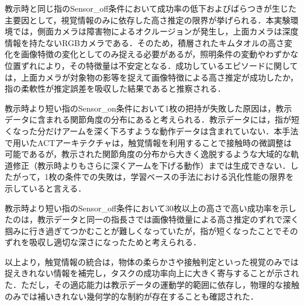 教示時と同じ指のSensor\_off条件において成功率の低下およびばらつきが生じた主要因として，視覚情報のみに依存した高さ推定の限界が挙げられる．本実験環境では，側面カメラは障害物によるオクルージョンが発生し，上面カメラは深度情報を持たないRGBカメラである．そのため，積層されたキムタオルの高さ変化を画像特徴の変化としてのみ捉える必要があるが，照明条件の変動やわずかな位置ずれにより，その特徴量は不安定となる．成功しているエピソードに関しては，上面カメラが対象物の影等を捉えて画像特徴による高さ推定が成功したか，指の柔軟性が推定誤差を吸収した結果であると推察される．\par
教示時より短い指のSensor\_on条件において1枚の把持が失敗した原因は，教示データに含まれる関節角度の分布にあると考えられる．教示データには，指が短くなった分だけアームを深く下ろすような動作データは含まれていない．本手法で用いたACTアーキテクチャは，触覚情報を利用することで接触時の微調整は可能であるが，教示された関節角度の分布から大きく逸脱するような大域的な軌道修正（教示時よりもさらに深くアームを下げる動作）までは生成できない．したがって，1枚の条件での失敗は，学習ベースの手法における汎化性能の限界を示していると言える．\par
教示時より短い指のSensor\_off条件において30枚以上の高さで高い成功率を示したのは，教示データと同一の指長さでは画像特徴量による高さ推定のずれで深く掴みに行き過ぎてつかむことが難しくなっていたが，指が短くなったことでそのずれを吸収し適切な深さになったためと考えられる．\par
以上より，触覚情報の統合は，物体の柔らかさや接触判定といった視覚のみでは捉えきれない情報を補完し，タスクの成功率向上に大きく寄与することが示された．ただし，その適応能力は教示データの運動学的範囲に依存し，物理的な接触のみでは補いきれない幾何学的な制約が存在することも確認された．\par

